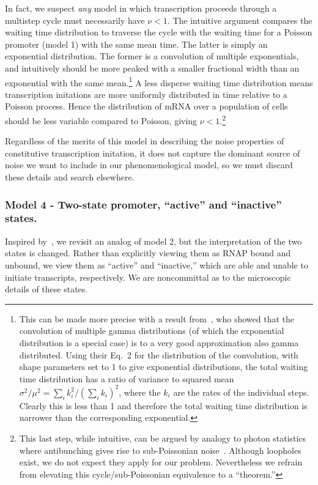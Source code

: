 In fact, we suspect \textit{any} model in which transcription proceeds through a
multistep cycle must necessarily have $\nu<1$. The intuitive argument compares
the waiting time distribution to traverse the cycle with the waiting time for a
Poisson promoter (model 1) with the same mean time. The latter is simply an
exponential distribution. The former is a convolution of multiple exponentials,
and intuitively should be more peaked with a smaller fractional width than an
exponential with the same mean.\footnote{This can be made more precise with a
result from~\cite{Stewart2007}, who showed that the convolution of multiple
gamma distributions (of which the exponential distribution is a special case) is
to a very good approximation also gamma distributed. Using their Eq.~2 for the
distribution of the convolution, with shape parameters set to 1 to give
exponential distributions, the total waiting time distribution has a ratio of
variance to squared mean $\sigma^2/\mu^2 = \sum_i k_i^2/\left(\sum_i
k_i\right)^2$, where the $k_i$ are the rates of the individual steps. Clearly
this is less than 1 and therefore the total waiting time distribution is
narrower than the corresponding exponential.} A less disperse waiting time
distribution means transcription initations are more uniformly distributed in
time relative to a Poisson process. Hence the distribution of mRNA over a
population of cells should be less variable compared to Poisson, giving
$\nu<1$.\footnote{This last step, while intuitive, can be argued by analogy to
photon statistics where antibunching gives rise to sub-Poissonian
noise~\cite{Paul1982, Zou1990}. Although loopholes exist, we do not expect they
apply for our problem. Nevertheless we refrain from elevating this
cycle/sub-Poissonian equivalence to a ``theorem.'' }

Regardless of the merits of this model in describing the noise properties of
constitutive transcription initation, it does not capture the dominant source of
noise we want to include in our phenomenological model, so we must discard these
details and search elsewhere.

\subsubsection{Model 4 - Two-state promoter, ``active'' and ``inactive''
states.} Inspired by~\cite{Razo-Mejia2020}, we revisit an analog of model 2, but
the interpretation of the two states is changed. Rather than explicitly viewing
them as RNAP bound and unbound, we view them as ``active'' and ``inactive,''
which are able and unable to initiate transcripts, respectively. We are
noncommittal as to the microscopic details of these states.

